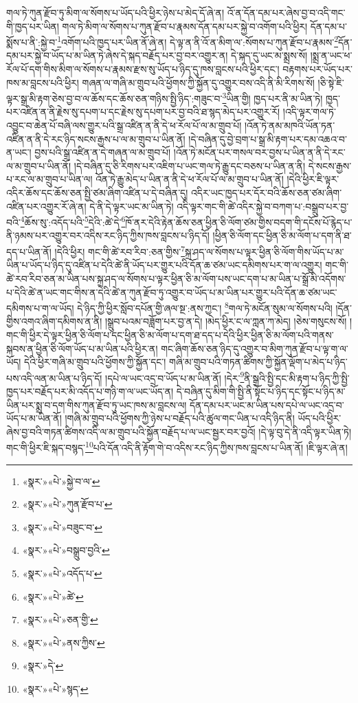གལ་ཏེ་ཀུན་རྫོབ་ཏུ་མིག་ལ་སོགས་པ་ཡོད་པའི་ཕྱིར་ཉེས་པ་མེད་དོ་ཞེ་ན། འོ་ན་དོན་དམ་པར་ཞེས་བྱ་བ་འདི་གང་གི་ཁྱད་པར་ཡིན། གལ་ཏེ་མིག་ལ་སོགས་པ་ཀུན་རྫོབ་པ་རྣམས་དོན་དམ་པར་སྐྱེ་བ་འགོག་པའི་ཕྱིར། དོན་དམ་པ་སྨོས་པ་ནི་:སྐྱེ་བ་\footnote{«སྣར་»«པེ་»སྐྱེ་བ་ལ་}འགོག་པའི་ཁྱད་པར་ཡིན་ནོ་ཞེ་ན། དེ་ལྟ་ན་ནི་འོ་ན་མིག་ལ་:སོགས་པ་ཀུན་རྫོབ་པ་རྣམས་\footnote{«སྣར་»«པེ་»ཀུན་རྫོབ་པ་}དོན་དམ་པར་སྐྱེ་བ་ཡོད་པ་མ་ཡིན་ཏེ་ཞེས་དེ་སྐད་བརྗོད་པར་བྱ་བར་འགྱུར་ན། དེ་སྐད་དུ་ཡང་མ་སྨྲས་སོ། །སྨྲ་ན་ཡང་ཕ་རོལ་པོ་དག་གིས་མིག་ལ་སོགས་པ་རྣམས་རྫས་སུ་ཡོད་པ་ཉིད་དུ་ཁས་བླངས་པའི་ཕྱིར་དང་། བརྟགས་པར་ཡོད་པར་ཁས་མ་བླངས་པའི་ཕྱིར། གཞན་ལ་གཞི་མ་གྲུབ་པའི་ཕྱོགས་ཀྱི་སྐྱོན་དུ་འགྱུར་བས་འདི་ནི་མི་རིགས་སོ། །ཅི་སྟེ་ཇི་ལྟར་སྒྲ་མི་རྟག་ཅེས་བྱ་བ་ལ་ཆོས་དང་ཆོས་ཅན་གཉིས་སྤྱི་ཉིད་:གཟུང་བ་\footnote{«སྣར་»«པེ་»བཟུང་བ་}ཡིན་གྱི། ཁྱད་པར་ནི་མ་ཡིན་ཏེ། ཁྱད་པར་འཛིན་ན་ནི་རྗེས་སུ་དཔག་པ་དང་རྗེས་སུ་དཔག་པར་བྱ་བའི་ཐ་སྙད་མེད་པར་འགྱུར་རོ། །འདི་ལྟར་གལ་ཏེ་འབྱུང་བ་ཆེན་པོ་བཞི་ལས་གྱུར་པའི་སྒྲ་འཛིན་ན་ནི་དེ་ཕ་རོལ་པོ་ལ་མ་གྲུབ་པོ། །འོན་ཏེ་ནམ་མཁའི་ཡོན་ཏན་འཛིན་ན་ནི་དེ་རང་ཉིད་སངས་རྒྱས་པ་ལ་མ་གྲུབ་པ་ཡིན་ནོ། །དེ་བཞིན་དུ་བྱེ་བྲག་པ་སྒྲ་མི་རྟག་པར་དམ་འཆའ་བ་ན་ཡང་། བྱས་པའི་སྒྲ་འཛིན་ན་དེ་གཞན་ལ་མ་གྲུབ་པོ། །འོན་ཏེ་མངོན་པར་གསལ་བར་བྱས་པ་ཡིན་ན་ནི་དེ་རང་ལ་མ་གྲུབ་པ་ཡིན་ནོ། །དེ་བཞིན་དུ་ཅི་རིགས་པར་འཇིག་པ་ཡང་གལ་ཏེ་རྒྱུ་དང་བཅས་པ་ཡིན་ན་ནི། དེ་སངས་རྒྱས་པ་རང་ལ་མ་གྲུབ་པ་ཡིན་ལ། འོན་ཏེ་རྒྱུ་མེད་པ་ཡིན་ན་ནི་དེ་ཕ་རོལ་པོ་ལ་མ་གྲུབ་པ་ཡིན་ནོ། །དེའི་ཕྱིར་ཇི་ལྟར་འདིར་ཆོས་དང་ཆོས་ཅན་སྤྱི་ཙམ་ཞིག་འཛིན་པ་དེ་བཞིན་དུ། འདིར་ཡང་ཁྱད་པར་དོར་བའི་ཆོས་ཅན་ཙམ་ཞིག་འཛིན་པར་འགྱུར་རོ་ཞེ་ན། དེ་ནི་དེ་ལྟར་ཡང་མ་ཡིན་ཏེ། འདི་ལྟར་གང་གི་ཚེ་འདིར་སྐྱེ་བ་བཀག་པ་:བསྒྲུབ་པར་བྱ་བའི་\footnote{«སྣར་»«པེ་»བསྒྲུབ་བྱའི་}ཆོས་སུ་:འདོད་པའི་\footnote{«སྣར་»«པེ་»འདོད་པ་}དེའི་:ཚེ་དེ་\footnote{«སྣར་»«པེ་»ཚེ་}ཁོ་ནར་དེའི་རྟེན་ཆོས་ཅན་ཕྱིན་ཅི་ལོག་ཙམ་གྱིས་བདག་གི་དངོས་པོ་རྙེད་པ་ནི་ཉམས་པར་འགྱུར་བར་འདིས་རང་ཉིད་ཀྱིས་ཁས་བླངས་པ་ཉིད་དོ། །ཕྱིན་ཅི་ལོག་དང་ཕྱིན་ཅི་མ་ལོག་པ་དག་ནི་ཐ་དད་པ་ཡིན་ནོ། །དེའི་ཕྱིར། གང་གི་ཚེ་རབ་རིབ་:ཅན་གྱིས་\footnote{«སྣར་»«པེ་»ཅན་གྱི་}སྐྲ་ཤད་ལ་སོགས་པ་ལྟར་ཕྱིན་ཅི་ལོག་གིས་ཡོད་པ་མ་ཡིན་པ་ཡོད་པ་ཉིད་དུ་འཛིན་པ་དེའི་ཚེ་ནི་ཡོད་པར་གྱུར་པའི་དོན་ཆ་ཙམ་ཡང་དམིགས་པར་ག་ལ་འགྱུར། གང་གི་ཚེ་རབ་རིབ་ཅན་མ་ཡིན་པས་སྐྲ་ཤད་ལ་སོགས་པ་ལྟར་ཕྱིན་ཅི་མ་ལོག་པས་ཡང་དག་པ་མ་ཡིན་པ་སྒྲོ་མི་འདོགས་པ་དེའི་ཚེ་ན་ཡང་གང་གིས་ན་དེའི་ཚེ་ན་ཀུན་རྫོབ་ཏུ་འགྱུར་བ་ཡོད་པ་མ་ཡིན་པར་གྱུར་པའི་དོན་ཆ་ཙམ་ཡང་དམིགས་པ་ག་ལ་ཡོད། དེ་ཉིད་ཀྱི་ཕྱིར་སློབ་དཔོན་གྱི་ཞལ་སྔ་:ནས་ཀྱང་། \footnote{«སྣར་»«པེ་»ནས་ཀྱིས་}གལ་ཏེ་མངོན་སུམ་ལ་སོགས་པའི། །དོན་གྱིས་འགའ་ཞིག་དམིགས་ན་ནི། །སྒྲུབ་པའམ་བཟློག་པར་བྱ་ན་དེ། །མེད་ཕྱིར་ང་ལ་ཀླན་ཀ་མེད། །ཅེས་གསུངས་སོ། །གང་གི་ཕྱིར་དེ་ལྟར་ཕྱིན་ཅི་ལོག་པ་དང་ཕྱིན་ཅི་མ་ལོག་པ་དག་ཐ་དད་པ་དེའི་ཕྱིར་ཕྱིན་ཅི་མ་ལོག་པའི་གནས་སྐབས་ན་ཕྱིན་ཅི་ལོག་ཡོད་པ་མ་ཡིན་པའི་ཕྱིར་ན། གང་ཞིག་ཆོས་ཅན་ཉིད་དུ་འགྱུར་བ་མིག་ཀུན་རྫོབ་པ་ལྟ་ག་ལ་ཡོད། དེའི་ཕྱིར་གཞི་མ་གྲུབ་པའི་ཕྱོགས་ཀྱི་སྐྱོན་དང་། གཞི་མ་གྲུབ་པའི་གཏན་ཚིགས་ཀྱི་སྐྱོན་ལྡོག་པ་མེད་པ་ཉིད་པས་འདི་ལན་མ་ཡིན་པ་ཉིད་དོ། །དཔེ་ལ་ཡང་འདྲ་བ་ཡོད་པ་མ་ཡིན་ནོ། །དེར་\footnote{«སྣར་»དེ་}ནི་སྒྲའི་སྤྱི་དང་མི་རྟག་པ་ཉིད་ཀྱི་སྤྱི་ཁྱད་པར་བརྗོད་པར་མི་འདོད་པ་གཉི་ག་ལ་ཡང་ཡོད་ན། དེ་བཞིན་དུ་མིག་གི་སྤྱི་ནི་སྟོང་པ་ཉིད་དང་སྟོང་པ་ཉིད་མ་ཡིན་པར་སྨྲ་བ་དག་གིས་ཀུན་རྫོབ་ཏུ་ཡང་ཁས་མ་བླངས་ལ། དོན་དམ་པར་ཡང་མ་ཡིན་པས་དཔེ་ལ་ཡང་འདྲ་བ་ཡོད་པ་མ་ཡིན་ནོ། །གཞི་མ་གྲུབ་པའི་ཕྱོགས་ཀྱི་ཉེས་པ་བརྗོད་པའི་ཚུལ་གང་ཡིན་པ་འདི་ཉིད་ནི། ཡོད་པའི་ཕྱིར་ཞེས་བྱ་བའི་གཏན་ཚིགས་འདི་ལ་མ་གྲུབ་པའི་སྐྱོན་བརྗོད་པ་ལ་ཡང་སྦྱར་བར་བྱའོ། །དེ་ལྟ་བུ་དེ་ནི་འདི་ལྟར་ཡིན་ཏེ། གང་གི་ཕྱིར་ཇི་སྐད་བསྙད་\footnote{«སྣར་»«པེ་»སྙད་}པའི་དོན་འདི་ནི་རྟོག་གེ་བ་འདིས་རང་ཉིད་ཀྱིས་ཁས་བླངས་པ་ཡིན་ནོ། །ཇི་ལྟར་ཞེ་ན། 